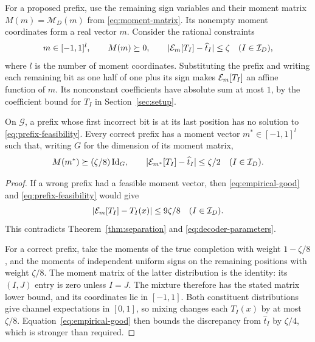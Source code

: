 For a proposed prefix, use the remaining sign variables and their moment
matrix \(M(m)=\mathcal M_D(m)\) from \eqref{eq:moment-matrix}.  Its nonempty moment
coordinates form a real vector \(m\).  Consider the rational constraints
\begin{equation}\label{eq:prefix-feasibility}
 m\in[-1,1]^l,\qquad M(m)\succeq0,\qquad
 |\mathcal E_m[T_I]-\widehat t_I|\le\zeta
 \quad(I\in\mathcal I_D),
\end{equation}
where \(l\) is the number of moment coordinates.  Substituting the prefix
and writing each remaining bit as one half of one plus its sign makes
\(\mathcal E_m[T_I]\) an affine function of \(m\).  Its nonconstant coefficients
have absolute sum at most \(1\), by the coefficient bound for \(T_I\)
in Section~\ref{sec:setup}.

\begin{lemma}\label{lem:prefix-slack}
On \(\mathcal G\), a prefix whose first incorrect bit is at its last
position has no solution to \eqref{eq:prefix-feasibility}.  Every correct
prefix has a moment vector \(m^*\in[-1,1]^l\) such that, writing \(G\)
for the dimension of its moment matrix,
\begin{equation}\label{eq:prefix-slack}
 M(m^*)\succeq(\zeta/8)\operatorname{Id}_G,\qquad
 |\mathcal E_{m^*}[T_I]-\widehat t_I|\le\zeta/2
 \quad(I\in\mathcal I_D).
\end{equation}
\end{lemma}

\begin{proof}
If a wrong prefix had a feasible moment vector, then
\eqref{eq:empirical-good} and \eqref{eq:prefix-feasibility} would give
\[
 |\mathcal E_m[T_I]-T_I(x)|\le 9\zeta/8
 \quad(I\in\mathcal I_D).
\]
This contradicts Theorem~\ref{thm:separation} and
\eqref{eq:decoder-parameters}.

For a correct prefix, take the moments of the true completion with
weight \(1-\zeta/8\), and the moments of independent uniform signs on
the remaining positions with weight \(\zeta/8\).  The moment matrix of
the latter distribution is the identity: its \((I,J)\) entry is zero
unless \(I=J\).  The mixture therefore has the stated matrix lower
bound, and its coordinates lie in \([-1,1]\).  Both constituent
distributions give channel expectations in \([0,1]\), so mixing changes
each \(T_I(x)\) by at most \(\zeta/8\).  Equation~\eqref{eq:empirical-good}
then bounds the discrepancy from \(\widehat t_I\) by \(\zeta/4\),
which is stronger than required.
\end{proof}

